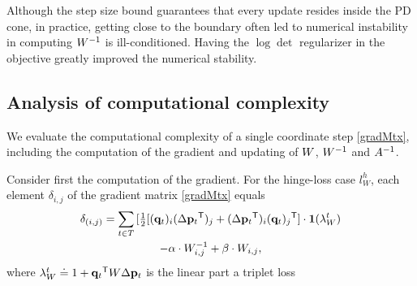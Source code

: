 \documentclass{article}
\begin{document}
Although the step size bound guarantees that every update resides inside the PD cone, in practice, getting close to the boundary often led to numerical instability in computing ${W}^{-1}$ is ill-conditioned. Having the  $\log \det$ regularizer in the objective greatly improved the numerical stability.


\subsection{Analysis of computational complexity}
We evaluate the computational complexity of a single coordinate step \eqref{gradMtx}, including the computation of the gradient and updating of ${W}$, ${W}^{-1}$ and $A^{-1}$.

Consider first the computation of the gradient. For the hinge-loss case $l^{h}_W$, each element $\delta_{i,j}$ of the gradient matrix \eqref{gradMtx} equals
\begin{multline}
    \delta_{(i,j)} = \sum\limits_{t\in T}{ [\tfrac{1}{2}[(\mathbf{q}_{t})_i(\Delta\mathbf{p}_{t}{}^\mathsf{T})_j + (\Delta\mathbf{p}_{t}{}^\mathsf{T})_i(\mathbf{q}_{t})_j{}^\mathsf{T}] } \cdot \textbf{1}(\lambda_{W}^t)  \\ 
 - \alpha \cdot {W}^{-1}_{i,j} + \beta \cdot {W}_{i,j},
\label{gradMatElem}
\end{multline}
where $\lambda_{W}^t \doteq 1+{{\mathbf{q}}_{{t}}}{}^\mathsf{T} {W} \Delta{\mathbf{p}}_{t}$ is the linear part a triplet loss
\end{document}
